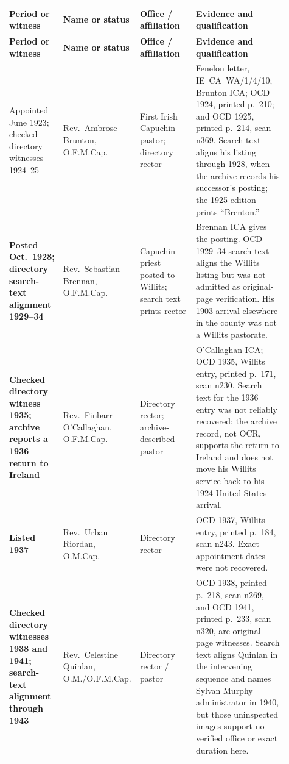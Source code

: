 \begin{longtable}{>{\bfseries\RaggedRight\arraybackslash}p{0.15\linewidth}>{\RaggedRight\arraybackslash}p{0.23\linewidth}>{\RaggedRight\arraybackslash}p{0.20\linewidth}>{\RaggedRight\arraybackslash}p{0.33\linewidth}}
\toprule
\textbf{Period or witness} & \textbf{Name or status} & \textbf{Office / affiliation} & \textbf{Evidence and qualification}\\
\midrule
\endfirsthead
\toprule
\textbf{Period or witness} & \textbf{Name or status} & \textbf{Office / affiliation} & \textbf{Evidence and qualification}\\
\midrule
\endhead
\bottomrule
\endfoot

Appointed June 1923; checked directory witnesses 1924--25 & Rev.~Ambrose Brunton, O.F.M.Cap. & First Irish Capuchin pastor; directory rector & Fenelon letter, IE~CA~WA/1/4/10; Brunton ICA; OCD 1924, printed p.~210; and OCD 1925, printed p.~214, scan n369. Search text aligns his listing through 1928, when the archive records his successor's posting; the 1925 edition prints ``Brenton.''\\

Posted Oct.~1928; directory search-text alignment 1929--34 & Rev.~Sebastian Brennan, O.F.M.Cap. & Capuchin priest posted to Willits; search text prints rector & Brennan ICA gives the posting. OCD 1929--34 search text aligns the Willits listing but was not admitted as original-page verification. His 1903 arrival elsewhere in the county was not a Willits pastorate.\\

Checked directory witness 1935; archive reports a 1936 return to Ireland & Rev.~Finbarr O'Callaghan, O.F.M.Cap. & Directory rector; archive-described pastor & O'Callaghan ICA; OCD 1935, Willits entry, printed p.~171, scan n230. Search text for the 1936 entry was not reliably recovered; the archive record, not OCR, supports the return to Ireland and does not move his Willits service back to his 1924 United States arrival.\\

Listed 1937 & Rev.~Urban Riordan, O.M.Cap. & Directory rector & OCD 1937, Willits entry, printed p.~184, scan n243. Exact appointment dates were not recovered.\\

Checked directory witnesses 1938 and 1941; search-text alignment through 1943 & Rev.~Celestine Quinlan, O.M./O.F.M.Cap. & Directory rector / pastor & OCD 1938, printed p.~218, scan n269, and OCD 1941, printed p.~233, scan n320, are original-page witnesses. Search text aligns Quinlan in the intervening sequence and names Sylvan Murphy administrator in 1940, but those uninspected images support no verified office or exact duration here.\\


\end{longtable}
